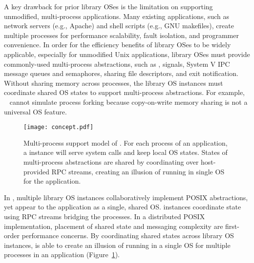 A key drawback for prior library OSes is the limitation on supporting unmodified, multi-process applications. Many existing applications, such as network servers (e.g., Apache) and shell scripts (e.g., GNU makefiles), create multiple processes for performance scalability, fault isolation, and programmer convenience.
In order for the efficiency benefits of library OSes to be widely applicable,
especially for unmodified Unix applications,
library OSes must provide commonly-used multi-process abstractions, such as , signals, System V IPC message queues and semaphores, sharing file descriptors, and exit notification.
Without sharing memory across processes, the library OS instances must coordinate shared OS states to support multi-process abstractions.
For example, \drawbridge{}~\cite{porter11drawbridge} cannot simulate process forking because copy-on-write memory sharing is not a universal OS feature.


\begin{figure}[t!]
\centering
\texttt{[image: concept.pdf]}
\caption{Multi-process support model of \graphene{} \libos{}. For each process of an application, a \libos{} instance will serve system calls and keep local OS states. States of multi-process abstractions are shared by coordinating over host-provided RPC streams, creating an illusion of running in single OS for the application.}
\label{fig:graphene:concept}
\end{figure}

In \graphene{}, multiple library OS instances collaboratively implement
POSIX abstractions, yet appear to the application as a single, shared OS.
\graphene{} instances coordinate state using RPC streams bridging the processes.
In a distributed POSIX implementation, placement of shared state and messaging complexity are first-order performance concerns.
By coordinating shared states across library OS instances, \graphene{} is able to create an illusion of running in a single OS for multiple processes in an application (Figure~\ref{fig:graphene:concept}).

